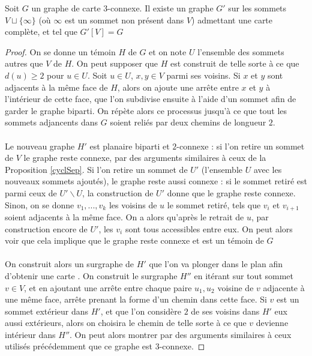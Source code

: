 \documentclass{scrartcl}
\begin{document}
\begin{flushleft}
\begin{prop*}[\ref{3connCompl}]
    Soit $G$ un graphe de carte $3$-connexe. Il existe un graphe $G'$ sur les sommets $V \sqcup \{\infty\}$ (où $\infty$ est un sommet non
    présent dans $V$) admettant une carte complète, et tel que $G'[V] = G$
\end{prop*}

\begin{proof}
    On se donne un témoin $H$ de $G$ et on note $U$ l'ensemble des sommets autres que $V$ de $H$. On peut supposer que $H$
    est construit de telle sorte à ce que $d(u) \geq 2$ pour $u \in U$. Soit $u \in U$, $x, y \in V$ parmi ses voisins.
    Si $x$ et $y$ sont adjacents à la même face de $H$, alors on ajoute une arrête entre $x$ et $y$ à l'intérieur de cette face,
    que l'on subdivise ensuite à l'aide d'un sommet afin de garder le graphe biparti. On répète alors
    ce processus jusqu'à ce que tout les sommets adjancents dans $G$ soient reliés par deux chemins de longueur $2$.
    \\~\\
    Le nouveau graphe $H'$ est planaire biparti et $2$-connexe : si l'on retire un sommet de $V$ le graphe reste connexe, par
    des arguments similaires à ceux de la Proposition \ref{cyclSep}.
    Si l'on retire un sommet de $U'$ (l'ensemble $U$ avec les nouveaux sommets ajoutés), le graphe reste aussi connexe :
    si le sommet retiré est parmi ceux de $U' \backslash U$, la construction de $U'$ donne que le graphe reste connexe. Sinon,
    on se donne $v_1, ..., v_k$ les voisins de $u$ le sommet retiré, tels que $v_i$ et $v_{i+1}$ soient adjacents à la
    même face. On a alors qu'après le retrait de $u$, par construction encore de $U'$, les $v_i$ sont tous accessibles
    entre eux. On peut alors voir que cela implique que le graphe reste connexe et est un témoin de $G$
    \\~\\
    On construit alors un surgraphe de $H'$ que l'on va plonger dans le plan afin d'obtenir une carte . On construit le
    surgraphe $H''$ en itérant sur tout sommet $v \in V$, et en ajoutant une arrête entre chaque paire $u_1, u_2$
    voisine de $v$ adjacente à une même face, arrête prenant la forme d'un chemin dans cette face. Si $v$ est
    un sommet extérieur dans $H'$, et que l'on considère $2$ de ses voisins dans $H'$ eux aussi extérieurs,
    alors on choisira le chemin de telle sorte à ce que $v$ devienne intérieur dans $H''$.
    On peut alors montrer par des arguments similaires à ceux utilisés précédemment que ce graphe est $3$-connexe.

\end{proof}
\end{flushleft}
\end{document}
